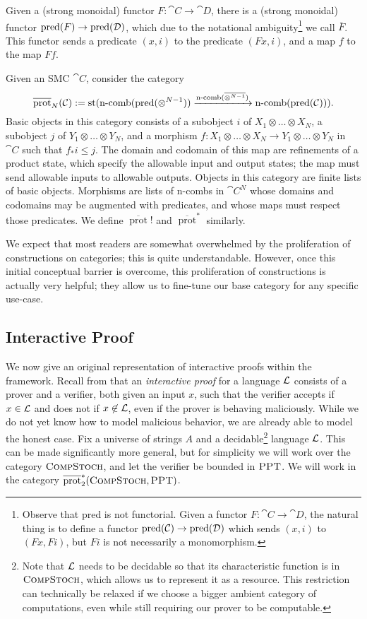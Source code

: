 Given a (strong monoidal) functor $F: \cat{C}\to\cat{D}$, there is a (strong
monoidal) functor $\operatorname{pred}(F)\to\operatorname{pred}({\mathcal{D}})$, which due to the notational
ambiguity\footnote{ Observe that pred is not functorial. Given a functor $F:
  \cat{C}\to\cat{D}$, the natural thing is to define a functor
  $\operatorname{pred}({\mathcal{C}})\to\operatorname{pred}({\mathcal{D}})$ which sends $(x, i)$ to $(Fx, Fi)$, but $Fi$
is not necessarily a monomorphism. } we call $\overline{F}$. This functor sends
a predicate $(x, i)$ to the predicate $(Fx, i)$, and a map $f$ to the map $Ff$.

Given an SMC $\cat{C}$, consider the category \[
  \overline{\operatorname{prot}}_{N}({\mathcal{C}}) := \operatorname*{st}(\operatorname*{n-comb}(\operatorname{pred}(\otimes^{N-1}))\xrightarrow{\operatorname*{n-comb}(\overline{\otimes^{N-1}})}\operatorname*{n-comb}(\operatorname{pred}({\mathcal{C}}))).
\]
Basic objects in this category consists of a subobject $i$ of $X_1\otimes \dots\otimes
X_N$, a subobject $j$ of $Y_1\otimes \dots\otimes Y_N$, and a morphism
$f: X_1\otimes\dots\otimes X_N\to Y_1\otimes\dots\otimes Y_N$ in $\cat{C}$ such
that $f_*i\leq j$. The domain and codomain of this map are refinements of a
product state, which specify the allowable input and output states; the map must
send allowable inputs to allowable outputs. Objects in this category are finite
lists of basic objects. Morphisms are lists of n-combs in $\cat{C}^N$ whose
domains and codomains may be augmented with predicates, and whose maps must
respect those predicates. We define $\overline{\operatorname{prot}}!$ and
$\overline{\operatorname{prot}}^*$ similarly.

We expect that most readers are somewhat overwhelmed by the
proliferation of constructions on categories; this is quite understandable.
However, once this initial conceptual barrier is overcome, this proliferation of
constructions is actually very helpful; they allow us to fine-tune our base
category for any specific use-case.

\subsection{Interactive Proof}
\label{sec:interactive proof}

We now give an original representation of interactive proofs within the
framework. Recall from 
that an \emph{interactive proof} for a
language $\mathcal{L}$ consists of a prover and a verifier, both given an input $x$,
such that the verifier accepts if $x\in\mathcal{L}$ and does not if $x\not\in\mathcal{L}$, even
if the prover is behaving maliciously. While we do not yet know how to model
malicious behavior, we are already able to model the honest case. Fix a universe
of strings $A$ and a decidable\footnote{
  Note that $\mathcal{L}$ needs to be decidable so that its characteristic function is
  in ${\textsc{\text{CompStoch}}}$, which allows us to represent it as a resource. This
  restriction can technically be relaxed if we choose a bigger ambient category
  of computations, even while still requiring our prover to be computable.
} language $\mathcal{L}$. This can be made significantly more
general, but for simplicity we will work over the category ${\textsc{\text{CompStoch}}}$,
and let the verifier be bounded in ${\textsc{\text{PPT}}}$. We will work in the category
$\overline{\operatorname{prot}}^*_{2}({\textsc{\text{CompStoch}}}, {\textsc{\text{PPT}}})$.

